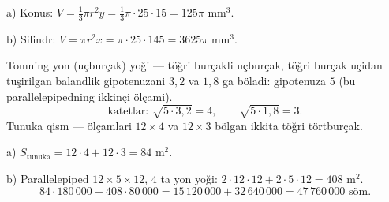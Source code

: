 a) Konus: $V=\frac13\pi r^2y=\frac13\pi\cdot25\cdot15=125\pi$ mm$^3$.

b) Silindr: $V=\pi r^2x=\pi\cdot25\cdot145=3625\pi$ mm$^3$.

\newpage
{}
Tomning yon (uçburçak) yoği — töğri burçakli uçburçak, töğri burçak uçidan tuşirilgan balandlik gipotenuzani $3{,}2$ va $1{,}8$ ga böladi: gipotenuza $5$ (bu parallelepipedning ikkinçi ölçami).
\[\text{katetlar: }\sqrt{5\cdot3{,}2}=4,\qquad\sqrt{5\cdot1{,}8}=3.\]
Tunuka qism — ölçamlari $12\times4$ va $12\times3$ bölgan ikkita töğri törtburçak.

a) $S_{\text{tunuka}}=12\cdot4+12\cdot3=84$ m$^2$.

b) Parallelepiped $12\times5\times12$, $4$ ta yon yoği: $2\cdot12\cdot12+2\cdot5\cdot12=408$ m$^2$.
\[84\cdot180\,000+408\cdot80\,000=15\,120\,000+32\,640\,000=47\,760\,000\text{ söm}.\]

\ShowJavoblar

